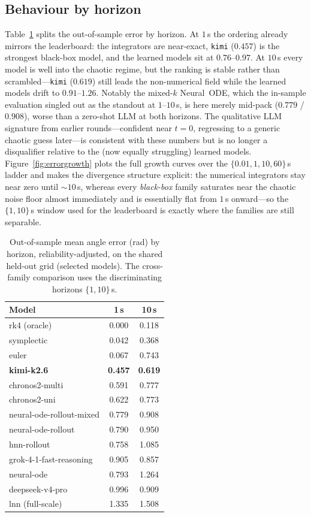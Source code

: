 \documentclass{article}
\begin{document}
\subsection{Behaviour by horizon}
Table~\ref{tab:horizon} splits the out-of-sample error by horizon. At $1$\,s the
ordering already mirrors the leaderboard: the integrators are near-exact, \texttt{kimi}
($0.457$) is the strongest black-box model, and the learned models sit at
$0.76$--$0.97$. At $10$\,s every model is well into the chaotic regime, but the
ranking is stable rather than scrambled---\texttt{kimi} ($0.619$) still leads the
non-numerical field while the learned models drift to $0.91$--$1.26$. Notably the
mixed-$k$ Neural~ODE, which the in-sample evaluation singled out as the standout at
$1$--$10$\,s, is here merely mid-pack ($0.779$ / $0.908$), worse than a zero-shot
LLM at both horizons. The qualitative LLM signature from earlier rounds---confident
near $t{=}0$, regressing to a generic chaotic guess later---is consistent with these
numbers but is no longer a disqualifier relative to the (now equally struggling)
learned models. Figure~\ref{fig:errorgrowth} plots the full growth curves over the
$\{0.01,1,10,60\}$\,s ladder and makes the divergence structure explicit: the numerical
integrators stay near zero until ${\sim}10$\,s, whereas every \emph{black-box} family
saturates near the chaotic noise floor almost immediately and is essentially flat from
$1$\,s onward---so the $\{1,10\}$\,s window used for the leaderboard is exactly where the
families are still separable.

\begin{table}[t]
\centering\small
\caption{Out-of-sample mean angle error (rad) by horizon, reliability-adjusted, on
the shared held-out grid (selected models). The cross-family comparison uses the
discriminating horizons $\{1,10\}$\,s.}
\label{tab:horizon}
\begin{tabular}{lcc}
\toprule
Model & 1\,s & 10\,s \\
\midrule
rk4 (oracle) & 0.000 & 0.118 \\
symplectic & 0.042 & 0.368 \\
euler & 0.067 & 0.743 \\
\textbf{kimi-k2.6} & \textbf{0.457} & \textbf{0.619} \\
chronos2-multi & 0.591 & 0.777 \\
chronos2-uni & 0.622 & 0.773 \\
neural-ode-rollout-mixed & 0.779 & 0.908 \\
neural-ode-rollout & 0.790 & 0.950 \\
hnn-rollout & 0.758 & 1.085 \\
grok-4-1-fast-reasoning & 0.905 & 0.857 \\
neural-ode & 0.793 & 1.264 \\
deepseek-v4-pro & 0.996 & 0.909 \\
lnn (full-scale) & 1.335 & 1.508 \\
\bottomrule
\end{tabular}
\end{table}
\end{document}
